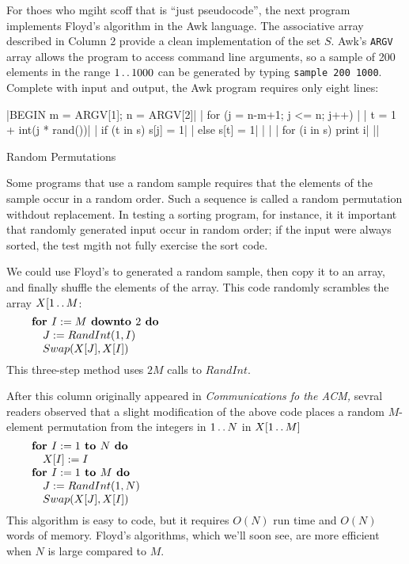 For thoes who mgiht scoff that  is ``just pseudocode'', the next program
implements Floyd's algorithm in the Awk language. The associative array
described in Column 2 provide a clean implementation of the set $S$. Awk's
{\tt ARGV} array allows the program to access command line arguments, so a
sample of 200 elements in the range $1\mathinner{\ldotp\ldotp}1000$ can be generated by typing
{\tt sample 200 1000}. Complete with input and output, the Awk program requires only eight lines:

\medskip
|BEGIN { m = ARGV[1]; n = ARGV[2]|\parbreak
|        for (j = n-m+1; j <= n; j++) {|\parbreak
|            t = 1 + int(j * rand())|\parbreak
|            if (t in s) s[j] = 1|\parbreak
|            else s[t] = 1|\parbreak
|        }|\parbreak
|        for (i in s) print i|\parbreak
|}|\parbreak

 Random Permutations

Some programs that use a random sample requires that the elements of the sample
occur in a random order. Such a sequence is called a random permutation withdout
replacement. In testing a sorting program, for instance, it it important that
randomly generated input occur in random order; if the input were always sorted,
the test mgith not fully exercise the sort code.

We could use Floyd's  to generated a random sample, then copy it to an
array, and finally shuffle the elements of the array. This code randomly
scrambles the array $X[1\mathinner{\ldotp\ldotp} M$:
$$\vbox{\let\par=\endgraf
\obeylines\sfcode`;=3000
{\bf for $I:=M$ downto $2$ do}
\quad $J:= RandInt(1, I)$
\quad $Swap(X[J], X[I])$
}$$
This three-step method uses $2M$ calls to $RandInt.$

After this column originally appeared in {\sl Communications fo the ACM,\/}
sevral readers observed that a slight modification of the above code places a
random $M$-element permutation from the integers in $1\mathinner{\ldotp\ldotp} N$ in
$X[1\mathinner{\ldotp\ldotp} M]$
$$\vbox{\let\par=\endgraf
\obeylines\sfcode`;=3000
{\bf for $I:=1$ to $N$ do}
\quad $X[I]:=I$
{\bf for $I:=1$ to $M$ do}
\quad $J:= RandInt(1, N)$
\quad $Swap(X[J], X[I])$
}$$
This algorithm is easy to code, but it requires $O(N)$ run time and $O(N)$ words
of memory. Floyd's algorithms, which we'll soon see, are more efficient when $N$
is large compared to $M$.

